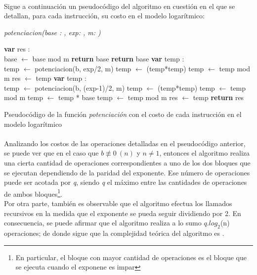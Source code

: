 \paragraph{}
Sigue a continuación un pseudocódigo del algoritmo en cuestión en el que se detallan, para cada instrucción, su costo en el modelo logarítmico: \\

\newpage
	\incmargin{1em}
	\linesnumbered

	\textsl{potenciacion(base : \nat,  exp: \nat,  m: \nat)}\\
		\begin{algorithm}[H]
			\BlankLine
			\textbf{var} res : \entero \\
			\BlankLine
			base $\leftarrow$ base mod m 
			\BlankLine
			 	{\textbf{return} base}
			{
				{\textbf{return} base}
			{
				{\textbf{var} temp : \entero \\
				temp $\leftarrow$ potenciacion(b, exp/2, m) 
				temp $\leftarrow$ (temp*temp) 
				temp $\leftarrow$ temp mod m 
				res $\leftarrow$ temp }
				{\textbf{var} temp : \entero \\
				temp $\leftarrow$ potenciacion(b, (exp-1)/2, m) 
				temp $\leftarrow$ (temp*temp) 
				temp $\leftarrow$ temp mod m 
				temp $\leftarrow$ temp * base 
				temp $\leftarrow$ temp mod m 
				res $\leftarrow$ temp }
			}}
			\BlankLine
			\textbf{return} res
			\caption{Pseudocódigo de la función \textit{potenciación} con el costo de cada instrucción en el modelo logarítmico}
		\end{algorithm}

\paragraph{}
Analizando los costos de las operaciones detalladas en el pseudocódigo anterior, se puede ver que en el caso que $b \not \equiv 0\ (n)$  y $n \neq 1$, entonces el algoritmo realiza una cierta cantidad de operaciones correspondientes a uno de los dos bloques que se ejecutan dependiendo de la paridad del exponente. Ese número de operaciones puede ser acotada por \textit{q}, siendo \textit{q} el máximo entre las cantidades de operaciones de ambos bloques\footnote{En particular, el bloque con mayor cantidad de operaciones es el bloque que se ejecuta cuando el exponene es impar}. \\
Por otra parte, también es observable que el algoritmo efectua los llamados recursivos en la medida que el exponente se pueda seguir dividiendo por 2. En consecuencia, se puede afirmar que el algoritmo realiza a lo sumo $q.log_2$(n) operaciones; de donde sigue que la complejidad teórica del algoritmo es .



